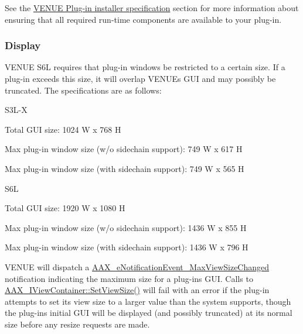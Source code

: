  See the \hyperlink{a00377_aax_venue_guide__installer}{V\+E\+N\+U\+E Plug-\/in installer specification} section for more information about ensuring that all required run-\/time components are available to your plug-\/in.

\hypertarget{a00377_aax_venue_guide__environment__display}{}\subsubsection{Display}\label{a00377_aax_venue_guide__environment__display}
 V\+E\+N\+U\+E S6\+L requires that plug-\/in windows be restricted to a certain size. If a plug-\/in exceeds this size, it will overlap V\+E\+N\+U\+E\textquotesingle{}s G\+U\+I and may possibly be truncated. The specifications are as follows\+: 
\begin{DoxyItemize}
\item S3\+L-\/\+X 
\begin{DoxyItemize}
\item Total G\+U\+I size\+: 1024 W x 768 H 
\item Max plug-\/in window size (w/o sidechain support)\+: 749 W x 617 H 
\item Max plug-\/in window size (with sidechain support)\+: 749 W x 565 H


\end{DoxyItemize}
\item S6\+L 
\begin{DoxyItemize}
\item Total G\+U\+I size\+: 1920 W x 1080 H 
\item Max plug-\/in window size (w/o sidechain support)\+: 1436 W x 855 H 
\item Max plug-\/in window size (with sidechain support)\+: 1436 W x 796 H


\end{DoxyItemize}
\end{DoxyItemize}

 V\+E\+N\+U\+E will dispatch a \hyperlink{a00206_afab5ea2cfd731fc8f163b6caa685406ea74ab285136093261fd246572659f119c}{A\+A\+X\+\_\+e\+Notification\+Event\+\_\+\+Max\+View\+Size\+Changed} notification indicating the maximum size for a plug-\/in\textquotesingle{}s G\+U\+I. Calls to \hyperlink{a00117_ad750e9f0231c61ab32114276ee8cb5f7}{A\+A\+X\+\_\+\+I\+View\+Container\+::\+Set\+View\+Size()} will fail with an error if the plug-\/in attempts to set its view size to a larger value than the system supports, though the plug-\/in\textquotesingle{}s initial G\+U\+I will be displayed (and possibly truncated) at its normal size before any resize requests are made.

